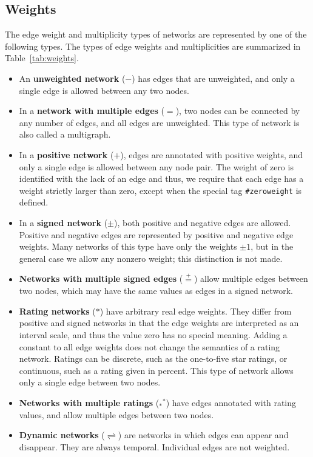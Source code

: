 \documentclass{article}
\begin{document}
\subsection{Weights}
The edge weight and multiplicity types of networks are represented by
one of the following types. 
The types of edge weights and multiplicities are summarized in
Table~\ref{tab:weights}. 
\begin{itemize}
\item An \textbf{unweighted network} ($-$) 
  has edges that are
  unweighted, and only a 
  single edge is allowed between any two nodes.  
\item In a \textbf{network with multiple edges} ($=$), 
  two nodes can be
  connected by any number of edges, and all edges are unweighted. This
  type of network is also called a multigraph.  
\item In a \textbf{positive network} ($+$), 
  edges are annotated
  with positive weights, and only a single edge is allowed between
  any node pair.  The weight of zero is identified with the lack of an edge
  and thus, we require that each edge has a weight strictly larger than
  zero, except when the special tag \texttt{\#zeroweight} is defined.
\item In a \textbf{signed network} ($\pm$), 
  both positive and negative edges are 
  allowed. Positive and negative edges are represented by positive and
  negative edge weights. Many networks of this type have only the
  weights $\pm 1$, but in the general case we allow any nonzero weight;
  this distinction is not made. 
\item \textbf{Networks with multiple signed edges} ($\stackrel{+}{=}$) 
  allow multiple edges between two nodes, which may have the same values
  as edges in a signed network.  
\item \textbf{Rating networks} ($*$) 
  have arbitrary real edge weights.  They
  differ from positive and signed networks in that the edge weights are
  interpreted as an interval scale, and thus the value zero has no
  special meaning.  Adding a constant to all edge weights does not
  change the semantics of a rating network. 
  Ratings can be discrete, such as the one-to-five star ratings, or
  continuous, such as a rating given in percent. 
  This type of network allows only a single edge between two nodes. 
\item \textbf{Networks with multiple ratings} ($_*{}^*$) 
  have edges annotated
  with rating values, and allow multiple edges between two nodes.
\item \textbf{Dynamic networks} ($\rightleftharpoons$) are networks in
  which edges can appear and disappear.  They are always
  temporal. Individual edges are not weighted. 
\end{itemize}
\end{document}
